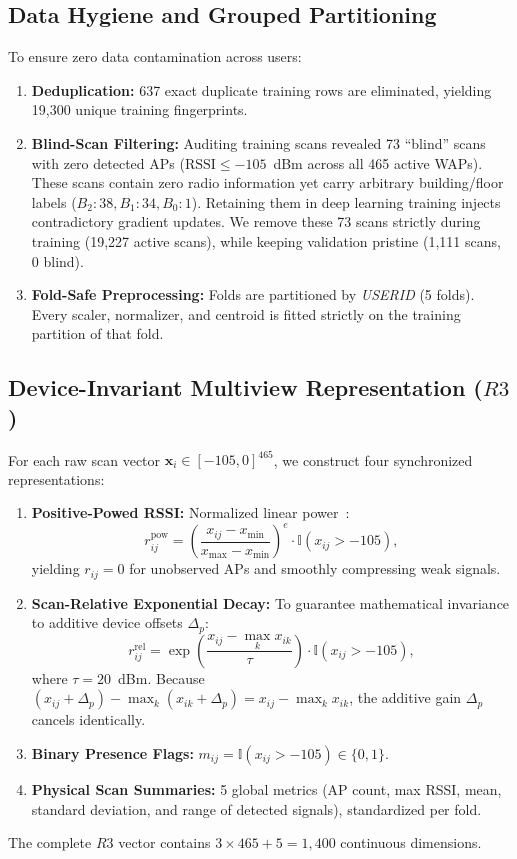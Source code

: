 \documentclass[conference]{IEEEtran}
\begin{document}
\subsection{Data Hygiene and Grouped Partitioning}
To ensure zero data contamination across users:
\begin{enumerate}
    \item \textbf{Deduplication:} 637 exact duplicate training rows are eliminated, yielding 19,300 unique training fingerprints.
    \item \textbf{Blind-Scan Filtering:} Auditing training scans revealed 73 ``blind'' scans with zero detected APs ($\text{RSSI} \le -105$~dBm across all 465 active WAPs). These scans contain zero radio information yet carry arbitrary building/floor labels ($B_2: 38, B_1: 34, B_0: 1$). Retaining them in deep learning training injects contradictory gradient updates. We remove these 73 scans strictly during training (19,227 active scans), while keeping validation pristine (1,111 scans, 0 blind).
    \item \textbf{Fold-Safe Preprocessing:} Folds are partitioned by \textit{USERID} (5 folds). Every scaler, normalizer, and centroid is fitted strictly on the training partition of that fold.
\end{enumerate}

\subsection{Device-Invariant Multiview Representation ($R3$)}
For each raw scan vector $\mathbf{x}_i \in [-105, 0]^{465}$, we construct four synchronized representations:
\begin{enumerate}
    \item \textbf{Positive-Powed RSSI:} Normalized linear power~\cite{torres2015evaluation}:
    \begin{equation}
    r_{ij}^{\text{pow}} = \left( \frac{x_{ij} - x_{\min}}{x_{\max} - x_{\min}} \right)^e \cdot \mathbb{I}(x_{ij} > -105),
    \end{equation}
    yielding $r_{ij} = 0$ for unobserved APs and smoothly compressing weak signals.
    \item \textbf{Scan-Relative Exponential Decay:} To guarantee mathematical invariance to additive device offsets $\Delta_p$:
    \begin{equation}
    r_{ij}^{\text{rel}} = \exp\left( \frac{x_{ij} - \max_k x_{ik}}{\tau} \right) \cdot \mathbb{I}(x_{ij} > -105),
    \end{equation}
    where $\tau = 20$~dBm. Because $(x_{ij} + \Delta_p) - \max_k (x_{ik} + \Delta_p) = x_{ij} - \max_k x_{ik}$, the additive gain $\Delta_p$ cancels identically.
    \item \textbf{Binary Presence Flags:} $m_{ij} = \mathbb{I}(x_{ij} > -105) \in \{0, 1\}$.
    \item \textbf{Physical Scan Summaries:} 5 global metrics (AP count, max RSSI, mean, standard deviation, and range of detected signals), standardized per fold.
\end{enumerate}
The complete $R3$ vector contains $3 \times 465 + 5 = 1{,}400$ continuous dimensions.
\end{document}
